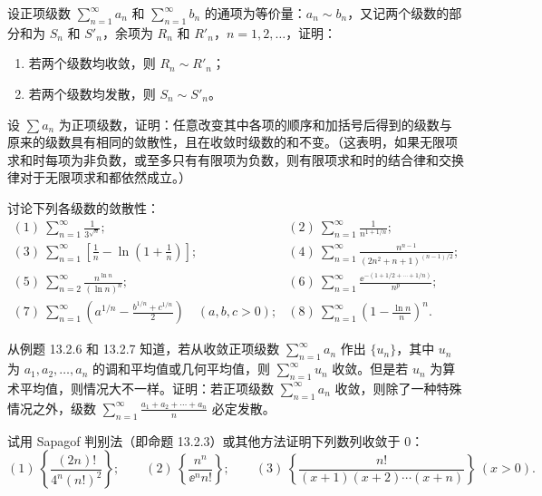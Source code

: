 \begin{xexercise}[1]
设正项级数 $\sum_{n=1}^{\infty}a_n$ 和 $\sum_{n=1}^{\infty}b_n$ 的通项为等价量：$a_n\sim b_n$，又记两个级数的部分和为 $S_n$ 和 $S'_n$，余项为 $R_n$ 和 $R'_n$，$n=1,2,\ldots$，证明：
\begin{enumerate}[label=(\arabic*)]
\item 若两个级数均收敛，则 $R_n\sim R'_n$；
\item 若两个级数均发散，则 $S_n\sim S'_n$。
\end{enumerate}
\end{xexercise}

\begin{xexercise}[2]
设 $\sum a_n$ 为正项级数，证明：任意改变其中各项的顺序和加括号后得到的级数与原来的级数具有相同的敛散性，且在收敛时级数的和不变。（这表明，如果无限项求和时每项为非负数，或至多只有有限项为负数，则有限项求和时的结合律和交换律对于无限项求和都依然成立。）
\end{xexercise}

\begin{xexercise}[3]
讨论下列各级数的敛散性：
\[
\begin{array}{ll}
(1)\ \displaystyle\sum_{n=1}^{\infty}\frac1{3^{\sqrt n}};&
(2)\ \displaystyle\sum_{n=1}^{\infty}\frac1{n^{1+1/n}};\\[6pt]
(3)\ \displaystyle\sum_{n=1}^{\infty}\left[\frac1n-\ln\left(1+\frac1n\right)\right];&
(4)\ \displaystyle\sum_{n=1}^{\infty}\frac{n^{n-1}}{(2n^2+n+1)^{(n-1)/2}};\\[6pt]
(5)\ \displaystyle\sum_{n=2}^{\infty}\frac{n^{\ln n}}{(\ln n)^n};&
(6)\ \displaystyle\sum_{n=1}^{\infty}\frac{\ee^{-(1+1/2+\cdots+1/n)}}{n^p};\\[6pt]
(7)\ \displaystyle\sum_{n=1}^{\infty}\left(a^{1/n}-\frac{b^{1/n}+c^{1/n}}2\right)\quad(a,b,c>0);&
(8)\ \displaystyle\sum_{n=1}^{\infty}\left(1-\frac{\ln n}{n}\right)^n.
\end{array}
\]
\end{xexercise}

\begin{xexercise}[4]
从例题 13.2.6 和 13.2.7 知道，若从收敛正项级数 $\sum_{n=1}^{\infty}a_n$ 作出 $\{u_n\}$，其中 $u_n$ 为 $a_1,a_2,\ldots,a_n$ 的调和平均值或几何平均值，则 $\sum_{n=1}^{\infty}u_n$ 收敛。但是若 $u_n$ 为算术平均值，则情况大不一样。证明：若正项级数 $\sum_{n=1}^{\infty}a_n$ 收敛，则除了一种特殊情况之外，级数 $\sum_{n=1}^{\infty}\frac{a_1+a_2+\cdots+a_n}{n}$ 必定发散。
\end{xexercise}

\begin{xexercise}[5]
试用 Sapagof 判别法（即命题 13.2.3）或其他方法证明下列数列收敛于 0：
\[
(1)\ \left\{\frac{(2n)!}{4^n(n!)^2}\right\};\qquad
(2)\ \left\{\frac{n^n}{\ee^n n!}\right\};\qquad
(3)\ \left\{\frac{n!}{(x+1)(x+2)\cdots(x+n)}\right\}\ (x>0).
\]
\end{xexercise}

